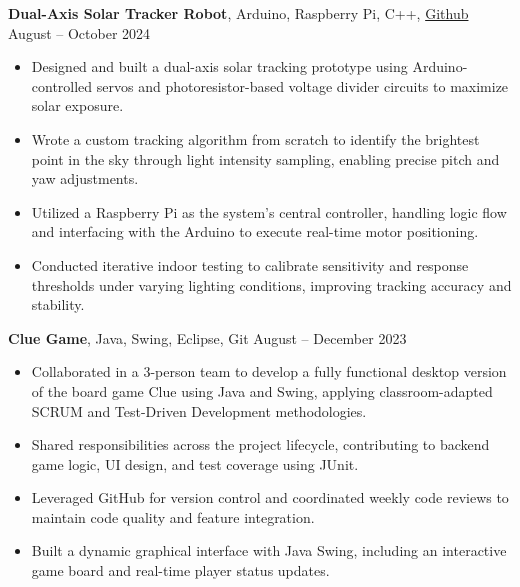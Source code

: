 \documentclass[11pt]{article}       %
\begin{document}
\textbf{Dual-Axis Solar Tracker Robot}, Arduino, Raspberry Pi, C++, \href{https://github.com/edwardasilva/SolarPanelProject}{Github} \hfill August -- October 2024
\vspace{-5pt}
\begin{itemize}
  \item Designed and built a dual-axis solar tracking prototype using Arduino-controlled servos and photoresistor-based voltage divider circuits to maximize solar exposure.
  \item Wrote a custom tracking algorithm from scratch to identify the brightest point in the sky through light intensity sampling, enabling precise pitch and yaw adjustments.
  \item Utilized a Raspberry Pi as the system's central controller, handling logic flow and interfacing with the Arduino to execute real-time motor positioning.
  \item Conducted iterative indoor testing to calibrate sensitivity and response thresholds under varying lighting conditions, improving tracking accuracy and stability.
\end{itemize}

\textbf{Clue Game}, Java, Swing, Eclipse, Git \hfill August -- December 2023
\vspace{-5pt}
\begin{itemize}
  \item Collaborated in a 3-person team to develop a fully functional desktop version of the board game Clue using Java and Swing, applying classroom-adapted SCRUM and Test-Driven Development methodologies.
  \item Shared responsibilities across the project lifecycle, contributing to backend game logic, UI design, and test coverage using JUnit.
  \item Leveraged GitHub for version control and coordinated weekly code reviews to maintain code quality and feature integration.
  \item Built a dynamic graphical interface with Java Swing, including an interactive game board and real-time player status updates.
\end{itemize}
\end{document}
